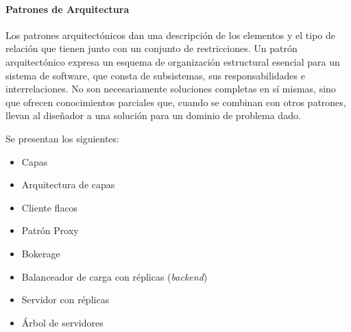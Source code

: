
\paragraph{Patrones de Arquitectura}

Los patrones arquitectónicos \cite{Pressman2019}  dan una descripción de los elementos y el tipo de relación que tienen junto con un conjunto de restricciones. Un patrón arquitectónico expresa un esquema de organización estructural esencial para un sistema de software, que consta de subsistemas, sus responsabilidades e interrelaciones.
No son necesariamente soluciones completas en sí mismas, sino que
ofrecen conocimientos parciales que, cuando se combinan con otros patrones, llevan al diseñador a una  solución para un dominio de problema dado.

 
	\begin{tcolorbox}
	[colback=red!5!white,colframe=red!75!black,fonttitle=\bfseries,title=  Patrones de Arquitectura]
	Se presentan los siguientes:
	\begin{itemize}
		\item Capas
		\item Arquitectura de capas
		\item Cliente flacos
		\item Patrón Proxy
		\item Bokerage 	
		\item Balanceador de carga con réplicas (\textit{backend})   
		\item Servidor con réplicas  
		\item \'Arbol de servidores		
	\end{itemize} 
	\end{tcolorbox}




